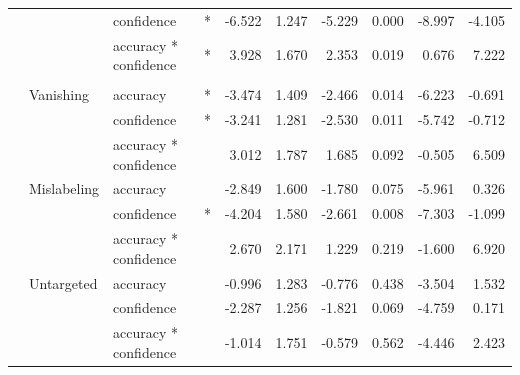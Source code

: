 \documentclass[
]{article}
\begin{document}
\begin{longtable}[t]{llllrrrrrr}
\cmidrule{3-10}\nopagebreak
\hspace{1em} &  & confidence & * & -6.522 & 1.247 & -5.229 & 0.000 & -8.997 & -4.105\\
\cmidrule{3-10}\nopagebreak
\hspace{1em} &  & accuracy * confidence & * & 3.928 & 1.670 & 2.353 & 0.019 & 0.676 & 7.222\\
\cmidrule{1-10}\pagebreak[0]
\addlinespace[0.3em]
\multicolumn{10}{l}{\textbf{Cascade R-CNN}}\\
\hspace{1em} & Vanishing & accuracy & * & -3.474 & 1.409 & -2.466 & 0.014 & -6.223 & -0.691\\
\cmidrule{3-10}\nopagebreak
\hspace{1em} &  & confidence & * & -3.241 & 1.281 & -2.530 & 0.011 & -5.742 & -0.712\\
\cmidrule{3-10}\nopagebreak
\hspace{1em} &  & accuracy * confidence &  & 3.012 & 1.787 & 1.685 & 0.092 & -0.505 & 6.509\\
\cmidrule{2-10}\nopagebreak
\hspace{1em} & Mislabeling & accuracy &  & -2.849 & 1.600 & -1.780 & 0.075 & -5.961 & 0.326\\
\cmidrule{3-10}\nopagebreak
\hspace{1em} &  & confidence & * & -4.204 & 1.580 & -2.661 & 0.008 & -7.303 & -1.099\\
\cmidrule{3-10}\nopagebreak
\hspace{1em} &  & accuracy * confidence &  & 2.670 & 2.171 & 1.229 & 0.219 & -1.600 & 6.920\\
\cmidrule{2-10}\nopagebreak
\hspace{1em} & Untargeted & accuracy &  & -0.996 & 1.283 & -0.776 & 0.438 & -3.504 & 1.532\\
\cmidrule{3-10}\nopagebreak
\hspace{1em} &  & confidence &  & -2.287 & 1.256 & -1.821 & 0.069 & -4.759 & 0.171\\
\cmidrule{3-10}\nopagebreak
\hspace{1em} &  & accuracy * confidence &  & -1.014 & 1.751 & -0.579 & 0.562 & -4.446 & 2.423\\
\bottomrule
\end{longtable}
\endgroup{}
\end{document}
